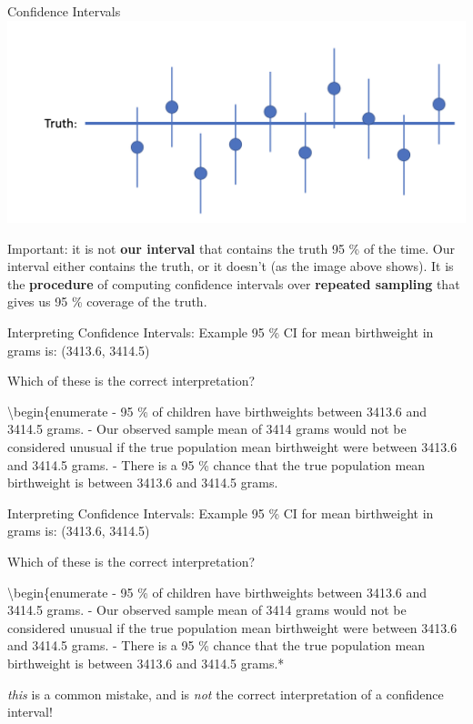 \documentclass[
  ignorenonframetext,
]{beamer}
\begin{document}
\begin{frame}{Confidence Intervals}
\protect\hypertarget{confidence-intervals-6}{}
\includegraphics{ci6.png}

Important: it is not \textbf{our interval} that contains the truth 95 \%
of the time. Our interval either contains the truth, or it doesn't (as
the image above shows). It is the \textbf{procedure} of computing
confidence intervals over \textbf{repeated sampling} that gives us 95 \%
coverage of the truth.
\end{frame}

\begin{frame}{Interpreting Confidence Intervals: Example}
\protect\hypertarget{interpreting-confidence-intervals-example}{}
95 \% CI for mean birthweight in grams is: (3413.6, 3414.5)

Which of these is the correct interpretation?

\textbackslash begin\{enumerate - 95 \% of children have birthweights
between 3413.6 and 3414.5 grams. - Our observed sample mean of 3414
grams would not be considered unusual if the true population mean
birthweight were between 3413.6 and 3414.5 grams. - There is a 95 \%
chance that the true population mean birthweight is between 3413.6 and
3414.5 grams.
\end{frame}

\begin{frame}{Interpreting Confidence Intervals: Example}
\protect\hypertarget{interpreting-confidence-intervals-example-1}{}
95 \% CI for mean birthweight in grams is: (3413.6, 3414.5)

Which of these is the correct interpretation?

\textbackslash begin\{enumerate - 95 \% of children have birthweights
between 3413.6 and 3414.5 grams. - {Our} observed sample mean of 3414
grams would not be considered unusual if the true population mean
birthweight were between 3413.6 and 3414.5 grams. - There is a 95 \%
chance that the true population mean birthweight is between 3413.6 and
3414.5 grams.*

\emph{this} is a common mistake, and is \emph{not} the correct
interpretation of a confidence interval!
\end{frame}
\end{document}
